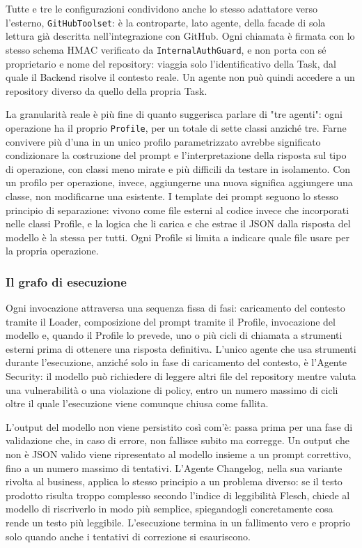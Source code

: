 \documentclass[12pt, a4paper]{article}
\begin{document}
Tutte e tre le configurazioni condividono anche lo stesso adattatore verso l'esterno, \texttt{GitHubToolset}: è la controparte, lato agente, della facade di sola lettura già descritta nell'integrazione con GitHub. Ogni chiamata è firmata con lo stesso schema HMAC verificato da \texttt{InternalAuthGuard}, e non porta con sé proprietario e nome del repository: viaggia solo l'identificativo della Task, dal quale il Backend risolve il contesto reale. Un agente non può quindi accedere a un repository diverso da quello della propria Task.

La granularità reale è più fine di quanto suggerisca parlare di "tre agenti": ogni operazione ha il proprio \texttt{Profile}, per un totale di sette classi anziché tre. Farne convivere più d'una in un unico profilo parametrizzato avrebbe significato condizionare la costruzione del prompt e l'interpretazione della risposta sul tipo di operazione, con classi meno mirate e più difficili da testare in isolamento. Con un profilo per operazione, invece, aggiungerne una nuova significa aggiungere una classe, non modificarne una esistente. I template dei prompt seguono lo stesso principio di separazione: vivono come file esterni al codice invece che incorporati nelle classi Profile, e la logica che li carica e che estrae il JSON dalla risposta del modello è la stessa per tutti. Ogni Profile si limita a indicare quale file usare per la propria operazione.

\subsubsection{Il grafo di esecuzione}

Ogni invocazione attraversa una sequenza fissa di fasi: caricamento del contesto tramite il Loader, composizione del prompt tramite il Profile, invocazione del modello e, quando il Profile lo prevede, uno o più cicli di chiamata a strumenti esterni prima di ottenere una risposta definitiva. L'unico agente che usa strumenti durante l'esecuzione, anziché solo in fase di caricamento del contesto, è l'Agente Security: il modello può richiedere di leggere altri file del repository mentre valuta una vulnerabilità o una violazione di policy, entro un numero massimo di cicli oltre il quale l'esecuzione viene comunque chiusa come fallita.

L'output del modello non viene persistito così com'è: passa prima per una fase di validazione che, in caso di errore, non fallisce subito ma corregge. Un output che non è JSON valido viene ripresentato al modello insieme a un prompt correttivo, fino a un numero massimo di tentativi. L'Agente Changelog, nella sua variante rivolta al business, applica lo stesso principio a un problema diverso: se il testo prodotto risulta troppo complesso secondo l'indice di leggibilità Flesch, chiede al modello di riscriverlo in modo più semplice, spiegandogli concretamente cosa rende un testo più leggibile. L'esecuzione termina in un fallimento vero e proprio solo quando anche i tentativi di correzione si esauriscono.
\end{document}
